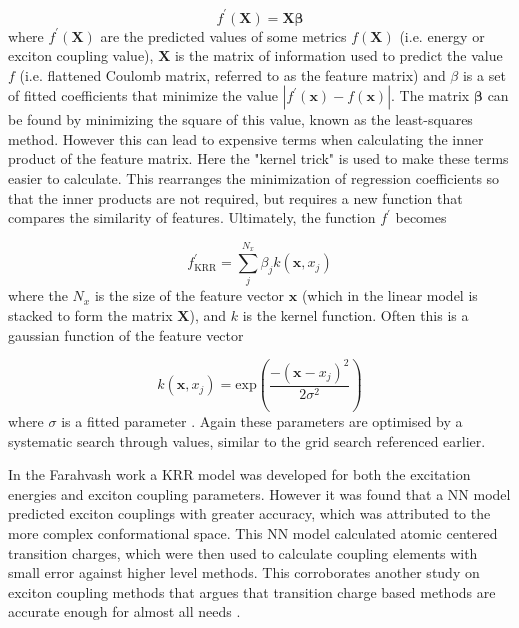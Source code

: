 \begin{equation}
	f^\prime\left(\mathbf{X}\right) = \mathbf{X} \mathbf{\beta}
\end{equation}
%
where $f^\prime\left(\mathbf{X}\right)$ are the predicted values of some metrics $f\left(\mathbf{X}\right)$ 
(i.e. \Qy energy or exciton coupling value), $\mathbf{X}$ is the matrix of information
used to predict the value $f$ (i.e. flattened Coulomb matrix, referred to as the feature
matrix) and $\beta$ is a set of fitted coefficients that minimize the value $\left\lvert f^\prime \left( \mathbf{x}\right) - f \left(\mathbf{x}\right)\right\rvert$.
The matrix $\mathbf{\beta}$ can be found by minimizing the square of this value, 
known as the least-squares method. However this can lead to expensive terms when
calculating the inner product of the feature matrix. Here the "kernel trick" is 
used to make these terms easier to calculate. This rearranges the minimization of
regression coefficients so that the inner products are not required, but requires 
a new function that compares the similarity of features. Ultimately, the function 
$f^\prime$ becomes

\begin{equation}
	f_{\text{KRR}}^\prime = \sum^{N_x}_j \beta_j k\left(\mathbf{x}, x_j\right)
\end{equation}
%
where the $N_x$ is the size of the feature vector $\mathbf{x}$ (which in the linear
model is stacked to form the matrix $\mathbf{X}$), and $k$ is the kernel function.
Often this is a gaussian function of the feature vector

\begin{equation}
	k\left(\mathbf{x}, x_j\right) = \text{exp}\left(\frac{-\left(\mathbf{x}-x_j\right)^2}{2\sigma^2}\right)
\end{equation}
%
where $\sigma$ is a fitted parameter \cite{Rasmussen2006}. Again these parameters 
are optimised by a systematic search through values, similar to the grid search
referenced earlier.

In the Farahvash work a KRR model was developed for both the excitation energies
and exciton coupling parameters. However it was found that a NN model predicted 
exciton couplings with greater accuracy, which was attributed to the more complex 
conformational space. This NN model calculated atomic centered transition charges,
which were then used to calculate coupling elements with small error against higher 
level methods. This corroborates another study on exciton coupling methods that
argues that transition charge based methods are accurate enough for almost all needs \cite{Kenny2016}.

